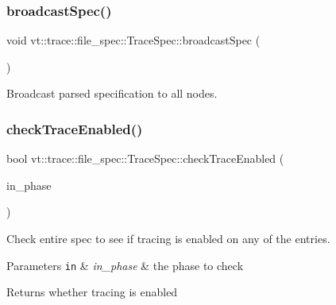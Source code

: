 \subsubsection{\texorpdfstring{broadcast\+Spec()}{broadcastSpec()}}
{\footnotesize\ttfamily void vt\+::trace\+::file\+\_\+spec\+::\+Trace\+Spec\+::broadcast\+Spec (\begin{DoxyParamCaption}{ }\end{DoxyParamCaption})}



Broadcast parsed specification to all nodes. 

\mbox{\label{structvt_1_1trace_1_1file__spec_1_1_trace_spec_adf331a01f94b57cb9229c89311f1bcda}} 
\subsubsection{\texorpdfstring{check\+Trace\+Enabled()}{checkTraceEnabled()}}
{\footnotesize\ttfamily bool vt\+::trace\+::file\+\_\+spec\+::\+Trace\+Spec\+::check\+Trace\+Enabled (\begin{DoxyParamCaption}\item[{\hyperlink{structvt_1_1trace_1_1file__spec_1_1_trace_spec_a4dd2e8fb971930351812d0f286baece2}{Spec\+Index}}]{in\+\_\+phase }\end{DoxyParamCaption})}



Check entire spec to see if tracing is enabled on any of the entries. 


\begin{DoxyParams}[1]{Parameters}
\mbox{\tt in}  & {\em in\+\_\+phase} & the phase to check\\
\hline
\end{DoxyParams}
\begin{DoxyReturn}{Returns}
whether tracing is enabled 
\end{DoxyReturn}
\mbox{\label{structvt_1_1trace_1_1file__spec_1_1_trace_spec_a66e362b05b4af9a4e4ef514a4e272599}} 
